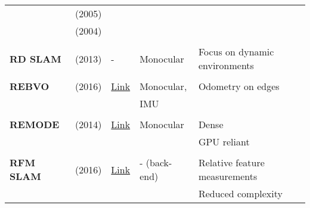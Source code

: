 \documentclass[a4paper,12pt]{scrartcl}
\begin{document}
{\begin{longtable}{l|l|l|l|l}
                           & \cite{Milford2005} (2005)         &                                                                    &                       &\\
                           & \cite{Milford2004} (2004)         &                                                                    &                       &\\
                           &                                   &                                                                    &                       &\\
    \textbf{RD SLAM}       & \cite{Tan2013a} (2013)            & -                                                                  & Monocular             & Focus on dynamic environments\\
                           &                                   &                                                                    &                       &\\
    \textbf{REBVO}         & \cite{Tarrio2016} (2016)          & {\href{https://github.com/JuanTarrio/rebvo}{Link}}                 & Monocular,            & Odometry on edges\\
                           &                                   &                                                                    & IMU                   &\\
                           &                                   &                                                                    &                       &\\
    \textbf{REMODE}        & \cite{Pizzoli2014} (2014)         & {\href{https://github.com/uzh-rpg/rpg_open_remode}{Link}}          & Monocular             & Dense\\
                           &                                   &                                                                    &                       & GPU reliant\\
                           &                                   &                                                                    &                       &\\
    \textbf{RFM SLAM}      & \cite{Agarwal2016} (2016)         & {\href{https://github.com/sauravag/edpl-rfmslam}{Link}}            & - (back-end)          & Relative feature measurements\\
                           &                                   &                                                                    &                       & Reduced complexity\\

\end{longtable}}
\end{document}

